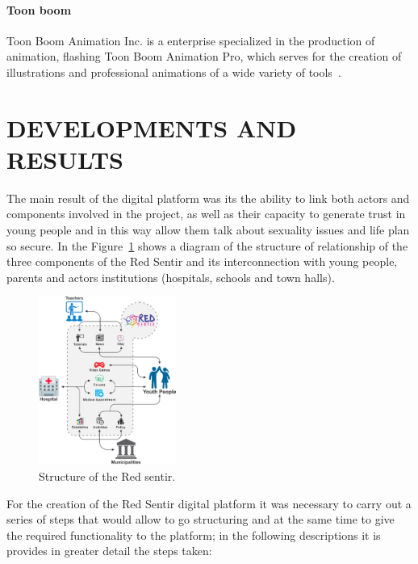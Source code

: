 \documentclass[journal,transmag]{IEEEtran}
\begin{document}
\paragraph{Toon boom} Toon Boom Animation Inc. is a enterprise specialized in the production of animation, flashing Toon Boom Animation Pro, which serves for the creation of illustrations and professional animations of a wide variety of tools~\cite{ToonB}. 

\section{DEVELOPMENTS AND RESULTS}\label{sec:resultados}

The main result of the digital platform was its the ability to link both actors and components involved in the project, as well as their capacity to generate trust in young people and in this way allow them talk about sexuality issues and life plan so secure. In the Figure~\ref{fig:estructura} shows a diagram of the structure of relationship of the three components of the Red Sentir and its interconnection with young people, parents and actors institutions (hospitals, schools and town halls). 

\begin{figure}[t]
\centering
\includegraphics[width=0.4\textwidth]{Digital_Platform.png}
\caption{Structure of the Red sentir.}
\label{fig:estructura}
\end{figure}
 
For the creation of the Red Sentir digital platform it was necessary to carry out a series of steps that would allow to go structuring and at the same time to give the required functionality to the platform; in the following descriptions it is provides in greater detail the steps taken:
\end{document}
